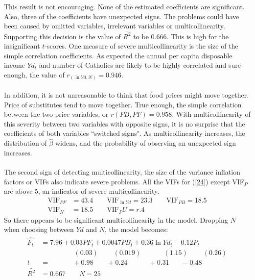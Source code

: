 \documentclass[11pt]{article}
\begin{document}
This result is not encouraging. None of the estimated coefficients are significant. Also, three of the coefficients have unexpected signs. The problems could have been caused by omitted variables, irrelevant variables or multicollinearity. Supporting this decision is the value of $\bar{R^2}$ to be 0.666. This is high for the insignificant $t$-scores.
One measure of severe multicollinearity is the size of the simple correlation coefficients. As expected the annual per capita disposable income $Yd_t$ and number of Catholics are likely to be highly correlated and sure enough, the value of $r_{(\ln Yd, N)} = 0.946$.\\ \\
In addition, it is not unreasonable to think that food prices might move together. Price of substitutes tend to move together. True enough, the simple correlation between the two price variables, or $r{(PB, PF)}=0.958$. With multicollinearity of this severity between two variables with opposite signs, it is no surprise that the coefficients of both variables ``switched signs". As multicollinearity increases, the distribution of $\hat{\beta}$ widens, and the probability of observing an unexpected sign increases.\\ \\
The second sign of detecting multicollinearity, the size of the variance inflation factors or VIFs also indicate severe problems. All the VIFs for (\ref{24}) except VIF$_P$ are above 5, an indicator of severe multicollinearity.
\begin{align*}
\text{VIF}_{PF} &= 43.4 \quad\quad\text{VIF}_{\ln Yd} = 23.3\quad\quad \text{VIF}_{PB} = 18.5\\
\text{VIF}_{N} &= 18.5 \quad\quad\text{VIF}_{P} U= r.4 
\end{align*}
So there appears to be significant multicollinearity in the model. Dropping $N$ when choosing between $Yd$ and $N$, the model becomes:
\begin{align}
\label{eg8_25}
\begin{split}
\hat{F_t} &= 7.96 + {0.03PF_t} + 0.0047PB_t + {0.36\ln Yd_t} - {0.12P_t}\\
&\>\>\>\>\>\>\>\>\>\>\>\>\>\>\>\>\>\>\>\>\>\> (0.03) 
\>\>\>\>\>\>\>\>\>\> (0.019)
\>\>\>\>\>\>\>\>\>\>\>\>\>\>\> (1.15)
\>\>\>\>\>\>\>\>\>\> (0.26)\\
t&=\>\>\>\>\>\>\>\>\>\>\>\>\>\>\> +0.98
\>\>\>\>\>\>\>\>\> +0.24
\>\>\>\>\>\>\>\>\>\>\>\>\>\>+0.31
\>\>\>\>\>\>\>\> -0.48\\
\bar{R^2}&= 0.667 \quad\quad N=25
\end{split}
\end{align}
\end{document}
